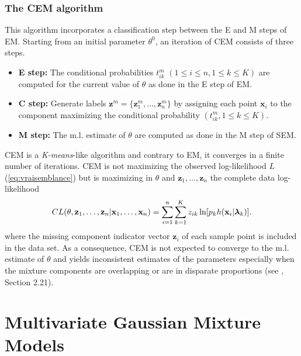 \documentclass[a4paper,10pt]{article}
\newcommand{\bz}{\mathbf{z}}
\newcommand{\blambda}{\boldsymbol{\lambda}}
\begin{document}
\subsubsection{The CEM algorithm}
This algorithm incorporates a classification step between the E and M steps of EM. Starting
from an initial parameter $\theta^0$, an iteration of CEM consists of three steps.
\begin{itemize}
\item {\bf E step:} The conditional probabilities $t^m_{ik}$ $(1 \leq i \leq n, 1 \leq k \leq
  K)$ are computed for the current value of $\theta$ as done in the E step of EM.
\item {\bf C step:} Generate labels ${\bz}^m=\{ {\bz}^m_1,...,{\bz}^m_n\}$ by assigning each
  point ${\mathbf x}_i$ to the component maximizing the conditional probability
  $(t^m_{ik}, 1 \leq k \leq K)$.
\item {\bf M step:} The m.l. estimate of $\theta$ are computed as done in the M step of SEM.
\end{itemize}
CEM is a {\em K-means}-like algorithm and contrary to EM, it converges in a finite number of
iterations. CEM is not maximizing the observed log-likelihood $L$ (\ref{eq:vraisemblance}) but
is maximizing in $\theta$ and $\bz_{1},\ldots,\bz_{n}$ the complete data log-likelihood
\begin{equation} \label{cl}
  CL(\theta, {\bf z}_{1},\ldots,{\bf z}_{n}|{\bf
    x}_{1},\ldots,{\bf x}_{n}) = \sum_{i=1}^n\sum_{k=1}^{K}
  z_{ik}\ln[p_{k} h({\bf x}_i|\blambda_k)].
\end{equation}
where the missing component indicator vector $\bz_i$ of each sample point is
included in the data set. As a consequence, CEM is not expected to converge to the m.l.
estimate of $\theta$ and yields inconsistent estimates of the parameters especially when the
mixture components are overlapping or are in disparate proportions (see \cite{McLachlanPeel00}, Section 2.21).


\section{Multivariate Gaussian Mixture Models}
\end{document}
